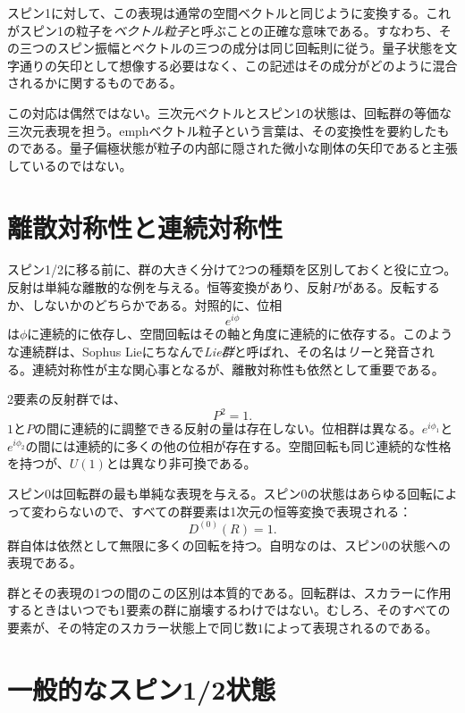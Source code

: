 スピン1に対して、この表現は通常の空間ベクトルと同じように変換する。これがスピン1の粒子を\emph{ベクトル粒子}と呼ぶことの正確な意味である。すなわち、その三つのスピン振幅とベクトルの三つの成分は同じ回転則に従う。量子状態を文字通りの矢印として想像する必要はなく、この記述はその成分がどのように混合されるかに関するものである。

この対応は偶然ではない。三次元ベクトルとスピン1の状態は、回転群の等価な三次元表現を担う。emph{ベクトル粒子}という言葉は、その変換性を要約したものである。量子偏極状態が粒子の内部に隠された微小な剛体の矢印であると主張しているのではない。

\section{離散対称性と連続対称性}

スピン1/2に移る前に、群の大きく分けて2つの種類を区別しておくと役に立つ。反射は単純な離散的な例を与える。恒等変換があり、反射\(P\)がある。反転するか、しないかのどちらかである。対照的に、位相
\begin{equation}
e^{i\phi}
\end{equation}
は\(\phi\)に連続的に依存し、空間回転はその軸と角度に連続的に依存する。このような連続群は、Sophus Lieにちなんで\emph{Lie群}と呼ばれ、その名は\emph{リー}と発音される。連続対称性が主な関心事となるが、離散対称性も依然として重要である。

2要素の反射群では、
\begin{equation}
P^2=1.
\end{equation}
\(1\)と\(P\)の間に連続的に調整できる反射の量は存在しない。位相群は異なる。\(e^{i\phi_1}\)と\(e^{i\phi_2}\)の間には連続的に多くの他の位相が存在する。空間回転も同じ連続的な性格を持つが、\(U(1)\)とは異なり非可換である。

スピン0は回転群の最も単純な表現を与える。スピン0の状態はあらゆる回転によって変わらないので、すべての群要素は1次元の恒等変換で表現される：
\begin{equation}
D^{(0)}(R)=1.
\end{equation}
群自体は依然として無限に多くの回転を持つ。自明なのは、スピン0の状態への表現である。

群とその表現の1つの間のこの区別は本質的である。回転群は、スカラーに作用するときはいつでも1要素の群に崩壊するわけではない。むしろ、そのすべての要素が、その特定のスカラー状態上で同じ数\(1\)によって表現されるのである。

\section{一般的なスピン1/2状態}


